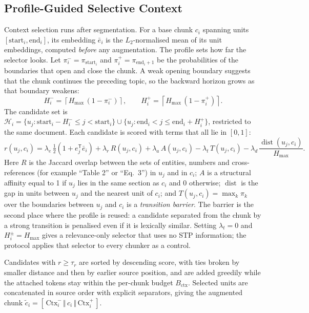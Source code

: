 \documentclass[10pt,a4paper]{article}
\DeclareMathOperator{\dist}{dist}
\newcommand{\ctx}{\mathrm{ctx}}
\begin{document}
\subsection{Profile-Guided Selective Context}

Context selection runs after segmentation. For a base chunk $c_i$ spanning units $[\mathrm{start}_i,\mathrm{end}_i]$, its embedding $\bar e_i$ is the $L_2$-normalised mean of its unit embeddings, computed \emph{before} any augmentation. The profile sets how far the selector looks. Let $\pi_i^-=\pi_{\mathrm{start}_i}$ and $\pi_i^+=\pi_{\mathrm{end}_i+1}$ be the probabilities of the boundaries that open and close the chunk. A weak opening boundary suggests that the chunk continues the preceding topic, so the backward horizon grows as that boundary weakens:
\begin{equation}
H_i^- = \left\lceil H_{\max}\,(1-\pi_i^-)\right\rceil,\qquad H_i^+ = \left\lceil H_{\max}\,(1-\pi_i^+)\right\rceil .
\label{eq:horizon}
\end{equation}
The candidate set is $\mathcal{H}_i=\{u_j:\mathrm{start}_i-H_i^-\le j<\mathrm{start}_i\}\cup\{u_j:\mathrm{end}_i<j\le\mathrm{end}_i+H_i^+\}$, restricted to the same document. Each candidate is scored with terms that all lie in $[0,1]$:
\begin{equation}
r(u_j,c_i) = \lambda_e\,\tfrac{1}{2}\left(1+e_j^{\mathsf T}\bar e_i\right) + \lambda_r\,R(u_j,c_i) + \lambda_a\,A(u_j,c_i) - \lambda_t\,T(u_j,c_i) - \lambda_d\,\frac{\dist(u_j,c_i)}{H_{\max}} .
\label{eq:contextscore}
\end{equation}
Here $R$ is the Jaccard overlap between the sets of entities, numbers and cross-references (for example ``Table 2'' or ``Eq.~3'') in $u_j$ and in $c_i$; $A$ is a structural affinity equal to 1 if $u_j$ lies in the same section as $c_i$ and 0 otherwise; $\dist$ is the gap in units between $u_j$ and the nearest unit of $c_i$; and $T(u_j,c_i)=\max_k \pi_k$ over the boundaries between $u_j$ and $c_i$ is a \emph{transition barrier}. The barrier is the second place where the profile is reused: a candidate separated from the chunk by a strong transition is penalised even if it is lexically similar. Setting $\lambda_t=0$ and $H_i^\pm=H_{\max}$ gives a relevance-only selector that uses no STP information; the protocol applies that selector to every chunker as a control.

Candidates with $r\ge\tau_r$ are sorted by descending score, with ties broken by smaller distance and then by earlier source position, and are added greedily while the attached tokens stay within the per-chunk budget $B_{\ctx}$. Selected units are concatenated in source order with explicit separators, giving the augmented chunk $\tilde c_i=[\,\mathrm{Ctx}^-_i\,\Vert\,c_i\,\Vert\,\mathrm{Ctx}^+_i\,]$.
\end{document}
